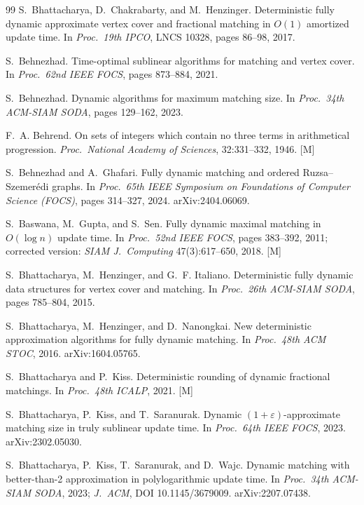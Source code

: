 \documentclass[11pt]{article}
\theoremstyle{definition}
\theoremstyle{remark}
\newcommand{\statusM}{\textcolor{orange!80!black}{\textsf{[M]}}}
\newcommand{\eps}{\varepsilon}
\begin{document}
\begin{thebibliography}{99}
S.~Bhattacharya, D.~Chakrabarty, and M.~Henzinger.
Deterministic fully dynamic approximate vertex cover and fractional
matching in $O(1)$ amortized update time.
In \emph{Proc.\ 19th IPCO}, LNCS 10328, pages 86--98, 2017.

S.~Behnezhad.
Time-optimal sublinear algorithms for matching and vertex cover.
In \emph{Proc.\ 62nd IEEE FOCS}, pages 873--884, 2021.

S.~Behnezhad.
Dynamic algorithms for maximum matching size.
In \emph{Proc.\ 34th ACM-SIAM SODA}, pages 129--162, 2023.

F.~A. Behrend.
On sets of integers which contain no three terms in arithmetical
progression.
\emph{Proc.\ National Academy of Sciences}, 32:331--332, 1946. \statusM

S.~Behnezhad and A.~Ghafari.
Fully dynamic matching and ordered Ruzsa--Szemer\'edi graphs.
In \emph{Proc.\ 65th IEEE Symposium on Foundations of Computer Science
(FOCS)}, pages 314--327, 2024. arXiv:2404.06069.

S.~Baswana, M.~Gupta, and S.~Sen.
Fully dynamic maximal matching in $O(\log n)$ update time.
In \emph{Proc.\ 52nd IEEE FOCS}, pages 383--392, 2011; corrected
version: \emph{SIAM J.\ Computing} 47(3):617--650, 2018. \statusM

S.~Bhattacharya, M.~Henzinger, and G.~F. Italiano.
Deterministic fully dynamic data structures for vertex cover and
matching.
In \emph{Proc.\ 26th ACM-SIAM SODA}, pages 785--804, 2015.

S.~Bhattacharya, M.~Henzinger, and D.~Nanongkai.
New deterministic approximation algorithms for fully dynamic matching.
In \emph{Proc.\ 48th ACM STOC}, 2016. arXiv:1604.05765.

S.~Bhattacharya and P.~Kiss.
Deterministic rounding of dynamic fractional matchings.
In \emph{Proc.\ 48th ICALP}, 2021. \statusM

S.~Bhattacharya, P.~Kiss, and T.~Saranurak.
Dynamic $(1+\eps)$-approximate matching size in truly sublinear update
time.
In \emph{Proc.\ 64th IEEE FOCS}, 2023. arXiv:2302.05030.

S.~Bhattacharya, P.~Kiss, T.~Saranurak, and D.~Wajc.
Dynamic matching with better-than-2 approximation in polylogarithmic
update time.
In \emph{Proc.\ 34th ACM-SIAM SODA}, 2023; \emph{J.\ ACM}, DOI
10.1145/3679009. arXiv:2207.07438.


\end{thebibliography}
\end{document}
